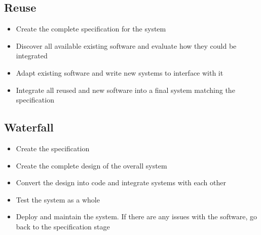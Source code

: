 \subsection*{Reuse}

\begin{itemize}
  \item Create the complete specification for the system
  \item Discover all available existing software and evaluate how they could be integrated
  \item Adapt existing software and write new systems to interface with it
  \item Integrate all reused and new software into a final system matching the specification
\end{itemize}

\subsection*{Waterfall}

\begin{itemize}
  \item Create the specification
  \item Create the complete design of the overall system
  \item Convert the design into code and integrate systems with each other
  \item Test the system as a whole
  \item Deploy and maintain the system. If there are any issues with the software, go back to the specification stage
\end{itemize}